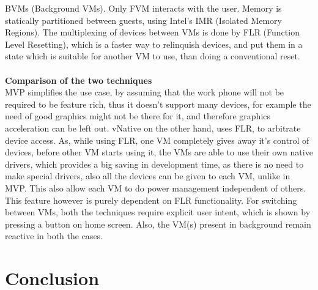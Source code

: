\documentclass[a4paper,10pt]{article}
\begin{document}
  BVMs (Background VMs). Only FVM interacts with the user. Memory is statically partitioned between guests, using Intel's IMR (Isolated Memory Regions).
  The multiplexing of devices between VMs is done by FLR (Function Level Resetting), which is a faster way to relinquish devices, and put them in a state which
  is suitable for another VM to use, than doing a conventional reset.
  \\\\
  \textbf{Comparison of the two techniques}
  \\
  MVP simplifies the use case, by assuming that the work phone will not be required to be feature rich, thus it doesn't support many devices, for example the need of 
  good graphics might not be there for it, and therefore graphics acceleration can be left out.
  vNative on the other hand, uses FLR, to arbitrate device access. As, while using FLR, one VM completely gives away it's control of devices, before other
  VM starts using it, the VMs are able to use their own native drivers, which provides a big saving in development time, as there is no need to make special
  drivers, also all the devices can be given to each VM, unlike in MVP. This also allow each VM to do power management independent of others. This feature however is purely dependent on FLR functionality.
  For switching between VMs, both the techniques require explicit user intent, which is shown by pressing a button on home screen. Also, the VM(s) present in 
  background remain reactive in both the cases.
  
  
  


 


\section{Conclusion}
\clearpage
{}


\end{document}
